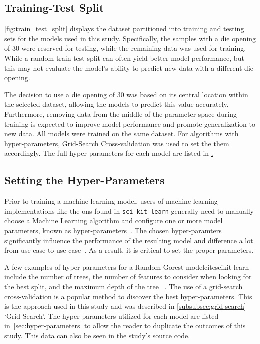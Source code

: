 {\subsection{Training-Test Split}\label{subsec:training-test-split}
\cref{fig:train_test_split} displays the dataset partitioned into training and testing sets for the models used in
this study.
Specifically, the samples with a die opening of 30 were reserved for testing, while the remaining data was used for
training.
While a random train-test split can often yield better model performance, but this may not evaluate the model's ability
to predict new data with a different die opening.

The decision to use a die opening of 30 was based on its central location within the selected dataset, allowing the
models to predict this value accurately. Furthermore, removing data from the middle of the parameter space during
training is expected to improve model performance and promote generalization to new data.
All models were trained on the same dataset.
For algorithms with hyper-parameters, Grid-Search Cross-validation was used to set the them accordingly.
The full hyper-parameters for each model are listed in \href{sec:hyper-parameters}.

\subsection{Setting the Hyper-Parameters}\label{subsec:hyper-parameters}
Prior to training a machine learning model, users of machine learning implementations like the ons found in
\texttt{sci-kit learn} generally need to manually choose a Machine Learning algorithm and configure one or more model
parameters, known as hyper-parameters~\cite[pp. 1]{claesen2015hyperparameter}.
The chosen hyper-paramters significantly influence the performance of the resulting model and difference a lot from use
case to use case~\cite[pp. 1]{claesen2015hyperparameter}.
As a result, it is critical to set the proper parameters.

A few examples of hyper-parameters for a Random-Gorest modelcitescikit-learn include the number of trees, the number
of features to consider when looking for the best split, and the maximum depth of the tree
~\cite{scikit-learn}.
The use of a grid-search cross-validation is a popular method to discover the best hyper-parameters.
This is the approach used in this study and was described in \cref{subsubsec:grid-search} `Grid Search'.
The hyper-parameters utilized for each model are listed in~\cref{sec:hyper-parameters} to allow the reader to
duplicate the outcomes of this study.
This data can also be seen in the study's source code.


}
